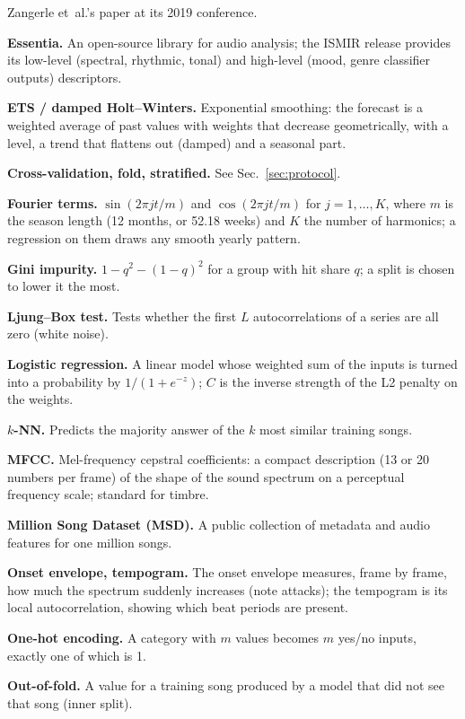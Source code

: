 {Zangerle et~al.'s paper at its 2019 conference.\par
\noindent\textbf{Essentia.} An open-source library for audio analysis; the ISMIR release provides its low-level (spectral,
rhythmic, tonal) and high-level (mood, genre classifier outputs) descriptors.\par
\noindent\textbf{ETS / damped Holt--Winters.} Exponential smoothing: the forecast is a weighted average of past values with
weights that decrease geometrically, with a level, a trend that flattens out (damped) and a seasonal part.\par
\noindent\textbf{Cross-validation, fold, stratified.} See Sec.~\ref{sec:protocol}.\par
\noindent\textbf{Fourier terms.} $\sin(2\pi jt/m)$ and $\cos(2\pi jt/m)$ for $j=1,\dots,K$, where $m$ is the season length (12
months, or 52.18 weeks) and $K$ the number of harmonics; a regression on them draws any smooth yearly pattern.\par
\noindent\textbf{Gini impurity.} $1-q^2-(1-q)^2$ for a group with hit share $q$; a split is chosen to lower it the most.\par
\noindent\textbf{Ljung--Box test.} Tests whether the first $L$ autocorrelations of a series are all zero (white noise).\par
\noindent\textbf{Logistic regression.} A linear model whose weighted sum of the inputs is turned into a probability by
$1/(1+e^{-z})$; $C$ is the inverse strength of the L2 penalty on the weights.\par
\noindent\textbf{$k$-NN.} Predicts the majority answer of the $k$ most similar training songs.\par
\noindent\textbf{MFCC.} Mel-frequency cepstral coefficients: a compact description (13 or 20 numbers per frame) of the shape of
the sound spectrum on a perceptual frequency scale; standard for timbre.\par
\noindent\textbf{Million Song Dataset (MSD).} A public collection of metadata and audio features for one million songs.\par
\noindent\textbf{Onset envelope, tempogram.} The onset envelope measures, frame by frame, how much the spectrum suddenly
increases (note attacks); the tempogram is its local autocorrelation, showing which beat periods are present.\par
\noindent\textbf{One-hot encoding.} A category with $m$ values becomes $m$ yes/no inputs, exactly one of which is 1.\par
\noindent\textbf{Out-of-fold.} A value for a training song produced by a model that did not see that song (inner split).\par
}
